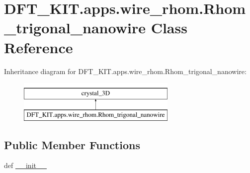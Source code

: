 \hypertarget{class_d_f_t___k_i_t_1_1apps_1_1wire__rhom_1_1_rhom__trigonal__nanowire}{\section{D\+F\+T\+\_\+\+K\+I\+T.\+apps.\+wire\+\_\+rhom.\+Rhom\+\_\+trigonal\+\_\+nanowire Class Reference}
\label{class_d_f_t___k_i_t_1_1apps_1_1wire__rhom_1_1_rhom__trigonal__nanowire}
}
Inheritance diagram for D\+F\+T\+\_\+\+K\+I\+T.\+apps.\+wire\+\_\+rhom.\+Rhom\+\_\+trigonal\+\_\+nanowire\+:\begin{figure}[H]
\begin{center}
\leavevmode
\includegraphics[height=2.000000cm]{class_d_f_t___k_i_t_1_1apps_1_1wire__rhom_1_1_rhom__trigonal__nanowire}
\end{center}
\end{figure}
\subsection*{Public Member Functions}
\begin{DoxyCompactItemize}
\item 
def \hyperlink{class_d_f_t___k_i_t_1_1apps_1_1wire__rhom_1_1_rhom__trigonal__nanowire_a74bcdd04bf4048cfefb5be83f7f15fe2}{\+\_\+\+\_\+init\+\_\+\+\_\+}
\end{DoxyCompactItemize}
